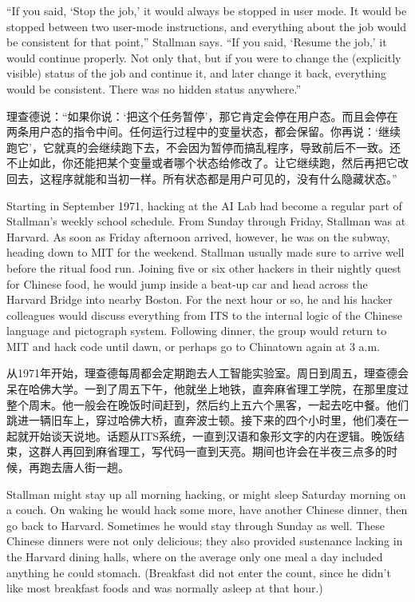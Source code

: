 \ifdefined\eng
``If you said, `Stop the job,' it would always be stopped in user mode. It would be stopped between two user-mode instructions, and everything about the job would be consistent for that point,'' Stallman says. ``If you said, `Resume the job,' it would continue properly. Not only that, but if you were to change the (explicitly visible) status of the job and continue it, and later change it back, everything would be consistent. There was no hidden status anywhere.''
\fi

\ifdefined\chs
理查德说：``如果你说：`把这个任务暂停'，那它肯定会停在用户态。而且会停在两条用户态的指令中间。任何运行过程中的变量状态，都会保留。你再说：`继续跑它'，它就真的会继续跑下去，不会因为暂停而搞乱程序，导致前后不一致。还不止如此，你还能把某个变量或者哪个状态给修改了。让它继续跑，然后再把它改回去，这程序就能和当初一样。所有状态都是用户可见的，没有什么隐藏状态。''
\fi

\ifdefined\eng
Starting in September 1971, hacking at the AI Lab had become a regular part of Stallman's weekly school schedule. From Sunday through Friday, Stallman was at Harvard. As soon as Friday afternoon arrived, however, he was on the subway, heading down to MIT for the weekend. Stallman usually made sure to arrive well before the ritual food run. Joining five or six other hackers in their nightly quest for Chinese food, he would jump inside a beat-up car and head across the Harvard Bridge into nearby Boston. For the next hour or so, he and his hacker colleagues would discuss everything from ITS to the internal logic of the Chinese language and pictograph system. Following dinner, the group would return to MIT and hack code until dawn, or perhaps go to Chinatown again at 3 a.m.
\fi

\ifdefined\chs
从1971年开始，理查德每周都会定期跑去人工智能实验室。周日到周五，理查德会呆在哈佛大学。一到了周五下午，他就坐上地铁，直奔麻省理工学院，在那里度过整个周末。他一般会在晚饭时间赶到，然后约上五六个黑客，一起去吃中餐。他们跳进一辆旧车上，穿过哈佛大桥，直奔波士顿。接下来的四个小时里，他们凑在一起就开始谈天说地。话题从ITS系统，一直到汉语和象形文字的内在逻辑。晚饭结束，这群人再回到麻省理工，写代码一直到天亮。期间也许会在半夜三点多的时候，再跑去唐人街一趟。
\fi

\ifdefined\eng
Stallman might stay up all morning hacking, or might sleep Saturday morning on a couch. On waking he would hack some more, have another Chinese dinner, then go back to Harvard.  Sometimes he would stay through Sunday as well.  These Chinese dinners were not only delicious; they also provided sustenance lacking in the Harvard dining halls, where on the average only one meal a day included anything he could stomach. (Breakfast did not enter the count, since he didn't like most breakfast foods and was normally asleep at that hour.)
\fi

